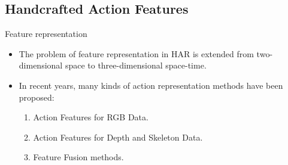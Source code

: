 \subsection{Handcrafted Action Features}
\begin{frame}{Feature representation}
    \begin{itemize}
        \item The problem of feature representation in HAR is extended from two-dimensional space to three-dimensional space-time.
        \item In recent years, many kinds of action representation methods have been proposed:
              \begin{enumerate}
                  \item Action Features for RGB Data.
                  \item Action Features for Depth and Skeleton Data.
                  \item Feature Fusion methods.
              \end{enumerate}
    \end{itemize}
\end{frame}

